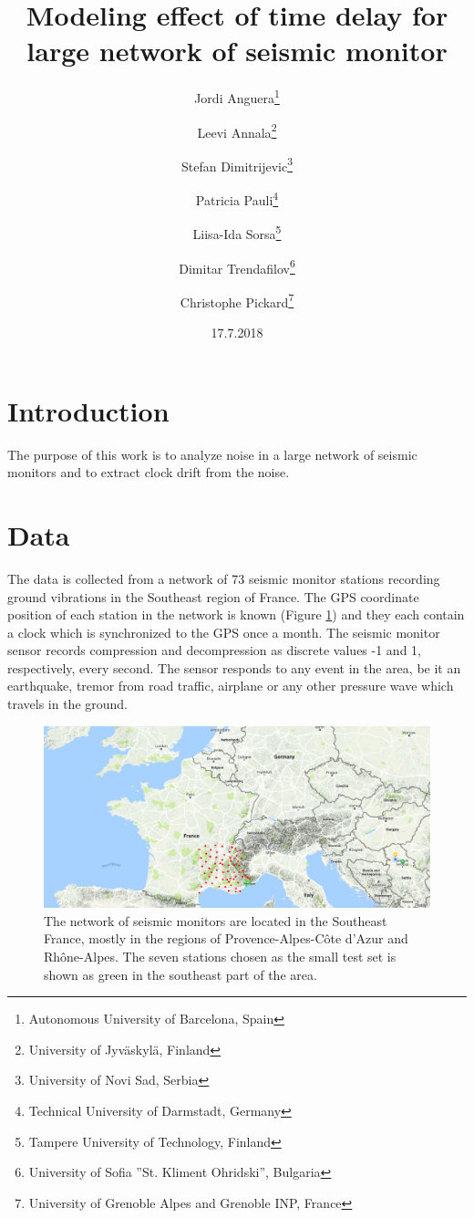 \documentclass[12pt,a4paper,english]{article}
\author{Jordi Anguera\thanks{Autonomous University of Barcelona, Spain} \and Leevi Annala\thanks{University of Jyväskylä, Finland} \and Stefan Dimitrijevic\thanks{University of Novi Sad, Serbia} \and Patricia Pauli\thanks{Technical University of Darmstadt, Germany} \and Liisa-Ida Sorsa\thanks{Tampere University of Technology, Finland} \and Dimitar Trendafilov\thanks{University of Sofia ''St. Kliment Ohridski'', Bulgaria} \and Christophe Pickard\thanks{University of Grenoble Alpes and Grenoble INP, France}}
\title{Modeling effect of time delay for large network of seismic monitor}
\date{17.7.2018}
\begin{document}
\maketitle

\begin{abstract}

\end{abstract}

\section{Introduction}

The purpose of this work is to analyze noise in a large network of seismic monitors and to extract clock drift from the noise. 

\section{Data}

The data is collected from a network of 73 seismic monitor stations recording ground vibrations in the Southeast region of France. The GPS coordinate position of each station in the network is known (Figure \ref{fig:monitornetwork}) and they each contain a clock which is synchronized to the GPS once a month. The seismic monitor sensor records compression and decompression as discrete values -1 and 1, respectively, every second. The sensor responds to any event in the area, be it an earthquake, tremor from road traffic, airplane or any other pressure wave which travels in the ground.

\begin{figure}[ht]
  \begin{center}   
   \includegraphics[width=\textwidth]{InitialStationSet.png}
  \end{center}
  \caption{The network of seismic monitors are located in the Southeast France, mostly in the regions of Provence-Alpes-C\^{o}te d'Azur and Rh\^{o}ne-Alpes. The seven stations chosen as the small test set is shown as green in the southeast part of the area.}\label{fig:monitornetwork}
\end{figure}
\end{document}
